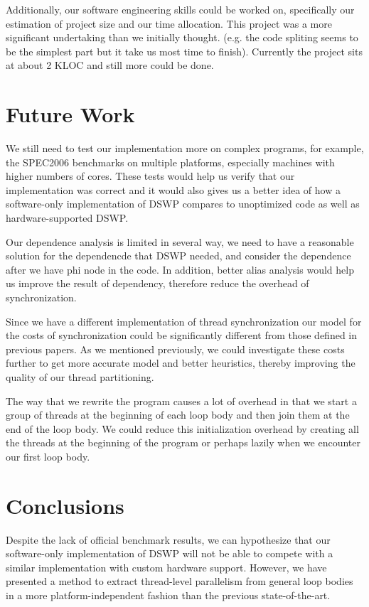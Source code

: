\documentclass[11pt, letter]{article}
\begin{document}
Additionally, our software engineering skills could be worked on, specifically our estimation of project size and our time allocation.  This project was a more significant undertaking than we initially thought. (e.g. the code spliting seems to be the simplest part but it take us most time to finish). Currently the project sits at about 2 KLOC and still more could be done.  

\section{Future Work}
We still need to test our implementation more on complex programs, for example, the SPEC2006 benchmarks on multiple platforms, especially machines with higher numbers of cores.  These tests would help us verify that our implementation was correct and it would also gives us a better idea of how a software-only implementation of DSWP compares to unoptimized code as well as hardware-supported DSWP.

Our dependence analysis is limited in several way, we need to have a reasonable solution for the dependencde that DSWP needed, and consider the dependence after we have phi node in the code. In addition, better alias analysis would help us improve the result of dependency, therefore reduce the overhead of synchronization.

Since we have a different implementation of thread synchronization our model for the costs of synchronization could be significantly different from those defined in previous papers. As we mentioned previously, we could investigate these costs further to get more accurate model and better heuristics, thereby improving the quality of our thread partitioning.

The way that we rewrite the program causes a lot of overhead in that we start a group of threads at the beginning of each loop body and then join them at the end of the loop body.  We could reduce this initialization overhead by creating all the threads at the beginning of the program or perhaps lazily when we encounter our first loop body.


\section{Conclusions}
Despite the lack of official benchmark results, we can hypothesize that our software-only implementation of DSWP will not be able to compete with a similar implementation with custom hardware support.  However, we have presented a method to extract thread-level parallelism from general loop bodies in a more platform-independent fashion than the previous state-of-the-art.
\end{document}
